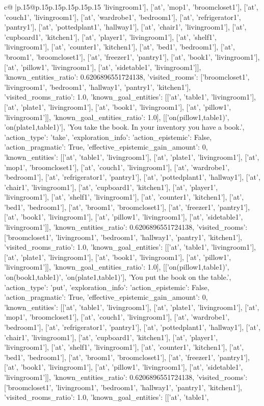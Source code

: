 \documentclass{article}
\begin{document}
{\begin{supertabular}{c@{$\;$}|p{.15\linewidth}@{}p{.15\linewidth}p{.15\linewidth}p{.15\linewidth}p{.15\linewidth}p{.15\linewidth}}
{{{'livingroom1'], ['at', 'mop1', 'broomcloset1'], ['at', 'couch1', 'livingroom1'], ['at', 'wardrobe1', 'bedroom1'], ['at', 'refrigerator1', 'pantry1'], ['at', 'pottedplant1', 'hallway1'], ['at', 'chair1', 'livingroom1'], ['at', 'cupboard1', 'kitchen1'], ['at', 'player1', 'livingroom1'], ['at', 'shelf1', 'livingroom1'], ['at', 'counter1', 'kitchen1'], ['at', 'bed1', 'bedroom1'], ['at', 'broom1', 'broomcloset1'], ['at', 'freezer1', 'pantry1'], ['at', 'book1', 'livingroom1'], ['at', 'pillow1', 'livingroom1'], ['at', 'sidetable1', 'livingroom1']], 'known_entities_ratio': 0.6206896551724138, 'visited_rooms': ['broomcloset1', 'livingroom1', 'bedroom1', 'hallway1', 'pantry1', 'kitchen1'], 'visited_rooms_ratio': 1.0, 'known_goal_entities': [['at', 'table1', 'livingroom1'], ['at', 'plate1', 'livingroom1'], ['at', 'book1', 'livingroom1'], ['at', 'pillow1', 'livingroom1']], 'known_goal_entities_ratio': 1.0}}], [['on(pillow1,table1)', 'on(plate1,table1)'], 'You take the book. In your inventory you have a book.', {'action_type': 'take', 'exploration_info': {'action_epistemic': False, 'action_pragmatic': True, 'effective_epistemic_gain_amount': 0, 'known_entities': [['at', 'table1', 'livingroom1'], ['at', 'plate1', 'livingroom1'], ['at', 'mop1', 'broomcloset1'], ['at', 'couch1', 'livingroom1'], ['at', 'wardrobe1', 'bedroom1'], ['at', 'refrigerator1', 'pantry1'], ['at', 'pottedplant1', 'hallway1'], ['at', 'chair1', 'livingroom1'], ['at', 'cupboard1', 'kitchen1'], ['at', 'player1', 'livingroom1'], ['at', 'shelf1', 'livingroom1'], ['at', 'counter1', 'kitchen1'], ['at', 'bed1', 'bedroom1'], ['at', 'broom1', 'broomcloset1'], ['at', 'freezer1', 'pantry1'], ['at', 'book1', 'livingroom1'], ['at', 'pillow1', 'livingroom1'], ['at', 'sidetable1', 'livingroom1']], 'known_entities_ratio': 0.6206896551724138, 'visited_rooms': ['broomcloset1', 'livingroom1', 'bedroom1', 'hallway1', 'pantry1', 'kitchen1'], 'visited_rooms_ratio': 1.0, 'known_goal_entities': [['at', 'table1', 'livingroom1'], ['at', 'plate1', 'livingroom1'], ['at', 'book1', 'livingroom1'], ['at', 'pillow1', 'livingroom1']], 'known_goal_entities_ratio': 1.0}}], [['on(pillow1,table1)', 'on(book1,table1)', 'on(plate1,table1)'], 'You put the book on the table.', {'action_type': 'put', 'exploration_info': {'action_epistemic': False, 'action_pragmatic': True, 'effective_epistemic_gain_amount': 0, 'known_entities': [['at', 'table1', 'livingroom1'], ['at', 'plate1', 'livingroom1'], ['at', 'mop1', 'broomcloset1'], ['at', 'couch1', 'livingroom1'], ['at', 'wardrobe1', 'bedroom1'], ['at', 'refrigerator1', 'pantry1'], ['at', 'pottedplant1', 'hallway1'], ['at', 'chair1', 'livingroom1'], ['at', 'cupboard1', 'kitchen1'], ['at', 'player1', 'livingroom1'], ['at', 'shelf1', 'livingroom1'], ['at', 'counter1', 'kitchen1'], ['at', 'bed1', 'bedroom1'], ['at', 'broom1', 'broomcloset1'], ['at', 'freezer1', 'pantry1'], ['at', 'book1', 'livingroom1'], ['at', 'pillow1', 'livingroom1'], ['at', 'sidetable1', 'livingroom1']], 'known_entities_ratio': 0.6206896551724138, 'visited_rooms': ['broomcloset1', 'livingroom1', 'bedroom1', 'hallway1', 'pantry1', 'kitchen1'], 'visited_rooms_ratio': 1.0, 'known_goal_entities': [['at', 'table1', }}}
\end{supertabular}}
\end{document}
